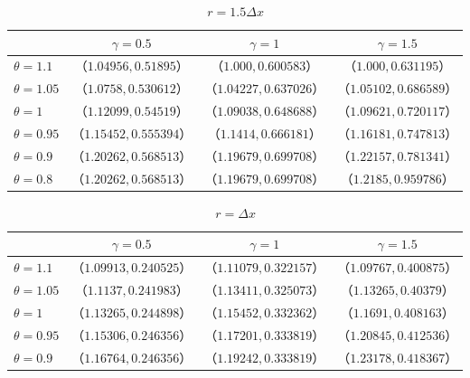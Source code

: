\documentclass[a4j,12pt]{jreport}
\begin{document}
\begin{table}[H]
    \centering
    \caption{$r = 1.5\varDelta x$} \label{table:r15dx}
    \begin{tabular}{|l|c|c|c|} 
    \hline
                			 	& $\gamma = 0.5$	 	& $\gamma =1$ 		 & $\gamma =1.5$ 		\\\hline\hline
     $\theta = 1.1$        & $（1.04956,0.51895）$ & $（1.000,0.600583）$ & $（1.000,0.631195）$			\\
     $\theta = 1.05$      & $（1.0758,0.530612）$ & $（1.04227,0.637026）$ & $（1.05102,0.686589）$                  \\
     $\theta = 1$   	 & $（1.12099,0.54519）$ & $（1.09038,0.648688）$ & $（1.09621,0.720117）$         \\
     $\theta = 0.95$      & $（1.15452,0.555394）$ & $（1.1414,0.666181）$ & $（1.16181,0.747813）$ \\
     $\theta = 0.9$  	 & $（1.20262,0.568513）$ & $（1.19679,0.699708）$ & $（1.22157,0.781341）$                     \\
     $\theta = 0.8$  	 & $（1.20262,0.568513）$ & $（1.19679,0.699708）$ & $（1.2185,0.959786）$                     \\
      \hline
    \end{tabular}
  \end{table}
  
\begin{table}[H]
    \centering
    \caption{$r = \varDelta x$} \label{table:r1dx}
    \begin{tabular}{|l|c|c|c|} 
    \hline
                			 	& $\gamma = 0.5$	 	& $\gamma =1$ 		 & $\gamma =1.5$ 		\\\hline\hline
     $\theta = 1.1$        & $（1.09913,0.240525）$ & $（1.11079,0.322157）$ & $（1.09767,0.400875）$			\\
     $\theta = 1.05$      & $（1.1137,0.241983）$ & $（1.13411,0.325073）$ & $（1.13265,0.40379）$                  \\
     $\theta = 1$   	 & $（1.13265,0.244898）$ & $（1.15452,0.332362）$ & $（1.1691,0.408163）$         \\
     $\theta = 0.95$      & $（1.15306,0.246356）$ & $（1.17201,0.333819）$ & $（1.20845,0.412536）$ \\
     $\theta = 0.9$  	 & $（1.16764,0.246356）$ & $（1.19242,0.333819）$ & $（1.23178,0.418367）$                     \\ \hline
    \end{tabular}
  \end{table}
\end{document}
